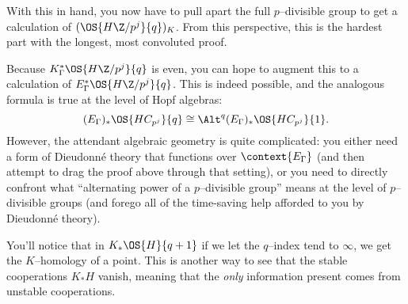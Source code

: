\begin{remark}
With this in hand, you now have to pull apart the full $p$--divisible group to get a calculation of $(\OS{H\Z/p^j}{q})_K$.  From this perspective, this is the hardest part with the longest, most convoluted proof.
\end{remark}

\begin{remark}
Because $K_\Gamma^* \OS{H\Z/p^j}{q}$ is even, you can hope to augment this to a calculation of $E_\Gamma^* \OS{H\Z/p^j}{q}$.  This is indeed possible, and the analogous formula is true at the level of Hopf algebras: \[(E_\Gamma)_* \OS{HC_{p^j}}{q} \cong \Alt^q (E_\Gamma)_* \OS{HC_{p^j}}{1}.\] However, the attendant algebraic geometry is quite complicated: you either need a form of Dieudonn\'e theory that functions over $\context{E_\Gamma}$ (and then attempt to drag the proof above through that setting), or you need to directly confront what ``alternating power of a $p$--divisible group'' means at the level of $p$--divisible groups (and forego all of the time-saving help afforded to you by Dieudonn\'e theory).
\end{remark}











\begin{remark}
You'll notice that in $K_* \OS{H}{q+1}$ if we let the $q$--index tend to $\infty$, we get the $K$--homology of a point.  This is another way to see that the stable cooperations $K_* H$ vanish, meaning that the \emph{only} information present comes from unstable cooperations.
\end{remark}















